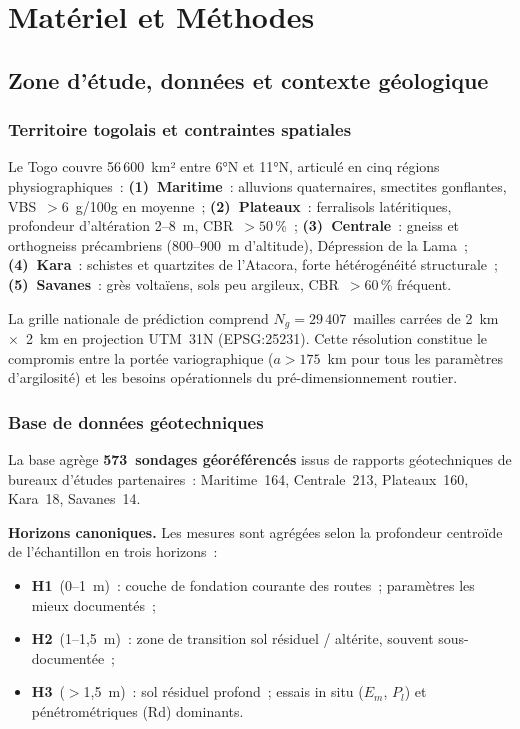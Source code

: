 \documentclass[10pt,a4paper,twocolumn]{article}
\begin{document}
	\section{Matériel et Méthodes}
	\label{sec:methodes}
	
	\subsection{Zone d'étude, données et contexte géologique}
	\label{sec:donnees}
	
	\subsubsection{Territoire togolais et contraintes spatiales}
	
	Le Togo couvre 56\,600~km² entre 6°N et 11°N, articulé en cinq
	régions physiographiques~:
	\textbf{(1)~Maritime}~: alluvions quaternaires, smectites gonflantes,
	VBS~$>6$~g/100g en moyenne~;
	\textbf{(2)~Plateaux}~: ferralisols latéritiques,
	profondeur d'altération 2--8~m, CBR~$>50$\,\%~;
	\textbf{(3)~Centrale}~: gneiss et orthogneiss précambriens (800--900~m
	d'altitude), Dépression de la Lama~;
	\textbf{(4)~Kara}~: schistes et quartzites de l'Atacora,
	forte hétérogénéité structurale~;
	\textbf{(5)~Savanes}~: grès voltaïens, sols peu argileux,
	CBR~$>60$\,\% fréquent.
	
	La grille nationale de prédiction comprend $N_g=29\,407$~mailles
	carrées de 2~km~$\times$~2~km en projection UTM~31N
	(EPSG:25231). Cette résolution constitue le compromis entre la portée
	variographique ($a>175$~km pour tous les paramètres d'argilosité) et
	les besoins opérationnels du pré-dimensionnement routier.
	
	\subsubsection{Base de données géotechniques}
	
	La base agrège \textbf{573~sondages géoréférencés} issus de rapports
	géotechniques de bureaux d'études partenaires~:
	Maritime~164, Centrale~213, Plateaux~160, Kara~18, Savanes~14.
	
	\textbf{Horizons canoniques.}
	Les mesures sont agrégées selon la profondeur centroïde de
	l'échantillon en trois horizons~:
	\begin{itemize}[noitemsep]
		\item \textbf{H1}~(0--1~m)~: couche de fondation courante des routes~;
		paramètres les mieux documentés~;
		\item \textbf{H2}~(1--1{,}5~m)~: zone de transition sol résiduel /
		altérite, souvent sous-documentée~;
		\item \textbf{H3}~($>$1{,}5~m)~: sol résiduel profond~;
		essais in situ ($E_m$, $P_l$) et pénétrométriques (Rd) dominants.
	\end{itemize}
	
\end{document}
